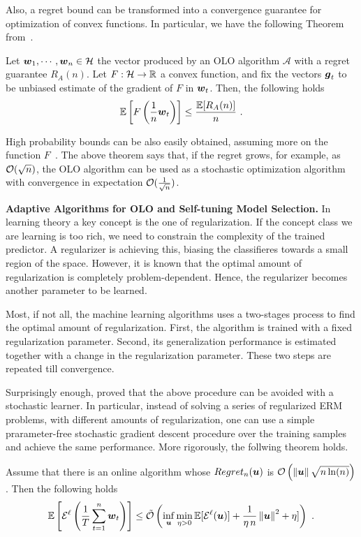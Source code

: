 Also, a regret bound can be transformed into a convergence guarantee for optimization of convex functions.
In particular, we have the following Theorem from~\citet{Cesa-BianchiCG04}.
%
\begin{theorem}
Let $\boldsymbol{w}_1, \cdots, \boldsymbol{w}_n \in \mathcal{H}$ the vector produced by an OLO algorithm $\mathcal{A}$ with a regret guarantee $R_A(n)$.
Let $F:\mathcal{H}\rightarrow\mathbb{R}$ a convex function, and fix the vectors $\boldsymbol{g}_t$ to be unbiased estimate of the gradient of $F$ in $\boldsymbol{w}_t$. Then, the following holds
\[
\mathbb{E}\left[F\left(\frac{1}{n} \boldsymbol{w}_t\right)\right] \leq \frac{\mathbb{E}[R_A(n)]}{n}~.
\]
\end{theorem}

High probability bounds can be also easily obtained, assuming more on the function $F$~\citep{Cesa-BianchiCG04}.
The above theorem says that, if the regret grows, for example, as $\mathcal{O}(\sqrt{n})$, the OLO algorithm can be used as a stochastic optimization algorithm with convergence in expectation $\mathcal{O}(\frac{1}{\sqrt{n}})$.


\textbf{Adaptive Algorithms for OLO and Self-tuning Model Selection.}
In learning theory a key concept is the one of regularization. If the concept class we are learning is too rich, we need to constrain the complexity of the trained predictor. A regularizer is achieving this, biasing the classifieres towards a small region of the space. However, it is known that the optimal amount of regularization is completely problem-dependent. Hence, the regularizer becomes another parameter to be learned.

Most, if not all, the machine learning algorithms uses a two-stages process to find the optimal amount of regularization. First, the algorithm is trained with a fixed regularization parameter. Second, its generalization performance is estimated together with a change in the regularization parameter. These two steps are repeated till convergence.

Surprisingly enough, \citep{Orabona14} proved that the above procedure can be avoided with a stochastic learner. In particular, instead of solving a series of regularized ERM problems, with different amounts of regularization, one can use a simple prarameter-free stochastic gradient descent procedure over the training samples and achieve the same performance.
More rigorously, the follwing theorem holds.
\begin{theorem}
\label{theo:self_tune}
Assume that there is an online algorithm whose $Regret_n(\boldsymbol{u})$ is $\mathcal{O}\left(\left\|{\boldsymbol{u}}\right\|\sqrt{n \ln(n)}\right)$. Then the following holds
\[
\mathbb{E}\left[\mathcal{E}^{\ell}\left(\frac{1}{T} \sum_{t=1}^n \boldsymbol{w}_t\right)\right] \leq \tilde{\mathcal{O}}\left(\inf_{\boldsymbol{u}} \min_{\eta>0} \mathbb{E}[\mathcal{E}^{\ell}(\boldsymbol{u})] + \frac{1}{\eta\,n}\left\|{\boldsymbol{u}}\right\|^2 +\eta] \right)~.
\]
\end{theorem}

